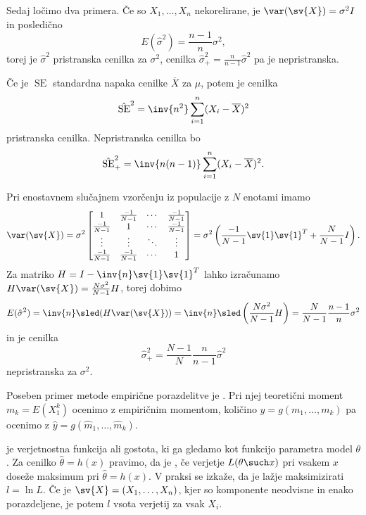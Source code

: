 Sedaj ločimo dva primera.
Če so $X_1, \ldots, X_n$ nekorelirane, je $\var(\sv{X}) = \sigma^2 I$ in
posledično
\[
  E(\hat{\sigma}^2) = \frac{n-1}{n} \sigma^2,
\]
torej je $\hat{\sigma}^2$ pristranska cenilka za $\sigma^2$, cenilka
$\hat{\sigma}^2_+ = \frac{n}{n-1} \hat{\sigma}^2$ pa je nepristranska.


Če je $\operatorname{SE}$ standardna napaka cenilke $\overline{X}$ za $\mu$,
potem je cenilka
\[
  \hat{\operatorname{SE}}^2 = \inv{n^2} \sum_{i=1}^n (X_i - \overline{X})^2
\]
pristranska cenilka.
Nepristranska cenilka bo
\[
  \hat{\operatorname{SE}}^2_+ = \inv{n(n-1)} \sum_{i=1}^n (X_i -
  \overline{X})^2.
\]

Pri enostavnem slučajnem vzorčenju iz populacije z $N$ enotami imamo
\[
  \var(\sv{X}) = \sigma^2
  \begin{bmatrix}
	1 & \frac{-1}{N-1} & \cdots & \frac{-1}{N-1} \\
	\frac{-1}{N-1} & 1 & \cdots & \frac{-1}{N-1} \\
	\vdots & \vdots & \ddots & \vdots \\
	\frac{-1}{N-1} & \frac{-1}{N-1} & \cdots & 1
  \end{bmatrix}
  = \sigma^2 \left(\frac{-1}{N-1} \sv{1} \sv{1}^T + \frac{N}{N-1} I\right).
\]
Za matriko $H = I - \inv{n} \sv{1} \sv{1}^T$ lahko izračunamo $H \var(\sv{X}) =
\frac{N \sigma^2}{N-1} H$, torej dobimo
\[
  E(\hat{\sigma}^2)
  = \inv{n} \sled(H \var(\sv{X}))
  = \inv{n} \sled \left( \frac{N \sigma^2}{N-1} H \right)
  = \frac{N}{N-1} \frac{n-1}{n} \sigma^2
\]
in je cenilka
\[
  \hat{\sigma}^2_+ = \frac{N-1}{N} \frac{n}{n-1} \hat{\sigma}^2
\]
nepristranska za $\sigma^2$.


Poseben primer metode empirične porazdelitve je .
Pri njej teoretični moment $m_k = E(X_1^k)$ ocenimo z empiričnim momentom,
količino $y = g(m_1, \ldots, m_k)$ pa ocenimo z $\hat{y} = g(\hat{m}_1, \ldots,
\hat{m}_k)$.



 je verjetnostna funkcija ali gostota, ki ga gledamo kot
funkcijo parametra model $\theta$.
Za cenilko $\hat{\theta} = h(x)$ pravimo, da je , če
verjetje $L(\theta \such x)$ pri vsakem $x$ doseže maksimum pri $\hat{\theta} =
h(x)$.
V praksi se izkaže, da je lažje maksimizirati $l = \ln L$.
Če je $\sv{X} = (X_1, \ldots, X_n)$, kjer so komponente neodvisne in enako
porazdeljene, je potem $l$ vsota verjetij za vsak $X_i$.

